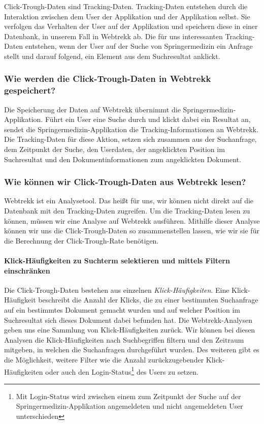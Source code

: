 Click-Trough-Daten sind Tracking-Daten. Tracking-Daten entstehen durch die Interaktion zwischen dem User der Applikation und der Applikation selbst. Sie verfolgen das Verhalten der User auf der Applikation und speichern diese in einer Datenbank, in unserem Fall in Webtrekk ab. Die für uns interessanten Tracking-Daten entstehen, wenn der User auf der Suche von Springermedizin ein Anfrage stellt und darauf folgend, ein Element aus dem Suchresultat anklickt.

\subsubsection{Wie werden die Click-Trough-Daten in Webtrekk gespeichert?}
\label{sec:Grundlagen:Grundbegriffe:Click-Trough-Daten:SpeichernClick-Trough-Daten}

Die Speicherung der Daten auf Webtrekk übernimmt die Springermedizin-Applikation. Führt ein User eine Suche durch und klickt dabei ein Resultat an, sendet die Springermedizin-Applikation die Tracking-Informationen an Webtrekk. Die Tracking-Daten für diese Aktion, setzen sich zusammen aus der Suchanfrage, dem Zeitpunkt der Suche, den Userdaten, der angeklickten Position im Suchresultat und den Dokumentinformationen zum angeklickten Dokument.

\subsubsection{Wie können wir Click-Trough-Daten aus Webtrekk lesen?}
\label{sec:Grundlagen:Grundbegriffe:Click-Trough-Daten:LesenClick-Trough-Daten}

Webtrekk ist ein Analysetool. Das heißt für uns, wir können nicht direkt auf die Datenbank mit den Tracking-Daten zugreifen. Um die Tracking-Daten lesen zu können, müssen wir eine Analyse auf Webtrekk ausführen. Mithilfe dieser Analyse können wir uns die Click-Trough-Daten so zusammenstellen lassen, wie wir sie für die Berechnung der Click-Trough-Rate benötigen.

\paragraph{Klick-Häufigkeiten zu Suchterm selektieren und mittels Filtern einschränken} 
Die Click-Trough-Daten bestehen aus einzelnen \textit{Klick-Häufigkeiten}. Eine Klick-Häufigkeit beschreibt die Anzahl der Klicks, die zu einer bestimmten Suchanfrage auf ein bestimmtes Dokument gemacht wurden und auf welcher Position im Suchresultat sich dieses Dokument dabei befunden hat. Die Webtrekk-Analysen geben uns eine Sammlung von Klick-Häufigkeiten zurück. Wir können bei diesen Analysen die Klick-Häufigkeiten nach Suchbegriffen filtern und den Zeitraum mitgeben, in welchen die Suchanfragen durchgeführt wurden. Des weiteren gibt es die Möglichkeit, weitere Filter wie die Anzahl zurückzugebender Klick-Häufigkeiten oder auch den \glqq Login-Status\footnote{Mit Login-Status wird zwischen einem zum Zeitpunkt der Suche auf der Springermedizin-Applikation angemeldeten und nicht angemeldeten User unterschieden} des Users\grqq{} zu setzen. 

